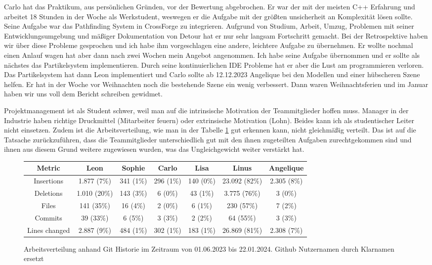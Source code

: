 Carlo hat das Praktikum, aus persönlichen Gründen, vor der Bewertung abgebrochen. Er war der mit der meisten C++ Erfahrung und arbeitet 18 Stunden in der Woche als Werkstudent, weswegen er die Aufgabe mit der größten unsicherheit an Komplexität lösen sollte. Seine Aufgabe war das Pathfinding System in CrossForge zu integrieren. Aufgrund von Studium, Arbeit, Umzug, Problemen mit seiner Entwicklungsumgebung und mäßiger Dokumentation von Detour hat er nur sehr langsam Fortschritt gemacht.  Bei der Retrospektive haben wir über diese Probleme gesprochen und ich habe ihm vorgeschlagen eine andere, leichtere Aufgabe zu übernehmen. Er wollte nochmal einen Anlauf wagen hat aber dann nach zwei Wochen mein Angebot angenommen. Ich habe seine Aufgabe übernommen und er sollte als nächstes das Partikelsystem implementieren. Durch seine kontinuierlichen IDE Probleme hat er aber die Lust am programmieren verloren. Das Partikelsystem hat dann Leon implementiert und Carlo sollte ab 12.12.2023 Angelique bei den Modellen und einer hübscheren Szene helfen. Er hat in der Woche vor Weihnachten noch die bestehende Szene ein wenig verbessert. Dann waren Weihnachtsferien und im Januar haben wir uns voll dem Bericht schreiben gewidmet.

Projektmanagement ist als Student schwer, weil man auf die intrinsische Motivation der Teammitglieder hoffen muss. Manager in der Industrie haben richtige Druckmittel (Mitarbeiter feuern) oder extrinsische Motivation (Lohn). Beides kann ich als studentischer Leiter nicht einsetzen. 
Zudem ist die Arbeitsverteilung, wie man in der Tabelle \ref{arbeitsaufteilung} gut erkennen kann, nicht gleichmäßig verteilt. Das ist auf die Tatsache zurückzuführen, dass die Teammitglieder unterschiedlich gut mit den ihnen zugeteilten Aufgaben zurechtgekommen sind und ihnen aus diesem Grund weitere zugewiesen wurden, was das Ungleichgewicht weiter verstärkt hat.

\begin{figure}[h!]
\begin{tabular}{|c|c|c|c|c|c|c|}
\hline
Metric        & Leon         & Sophie    & Carlo     & Lisa      & Linus         & Angelique \\
\hline
Insertions    & 1.877 (7\%)  & 341 (1\%) & 296 (1\%) & 140 (0\%) & 23.092 (82\%) & 2.305 (8\%) \\
\hline
Deletions     & 1.010 (20\%) & 143 (3\%) & 6 (0\%)   & 43 (1\%)  & 3.775 (76\%)  & 3 (0\%) \\
\hline
Files         & 141 (35\%)   & 16 (4\%)  & 2 (0\%)   & 6 (1\%)   & 230 (57\%)    & 7 (2\%) \\
\hline
Commits       & 39 (33\%)    & 6 (5\%)   & 3 (3\%)   & 2 (2\%)   & 64 (55\%)     & 3 (3\%) \\
\hline
Lines changed & 2.887 (9\%)  & 484 (1\%) & 302 (1\%) & 183 (1\%) & 26.869 (81\%) & 2.308 (7\%) \\
\hline
\end{tabular}
\caption{Arbeitsverteilung anhand Git Historie im Zeitraum von 01.06.2023 bis 22.01.2024. Github Nutzernamen durch Klarnamen ersetzt}
\label{arbeitsaufteilung}
\end{figure}